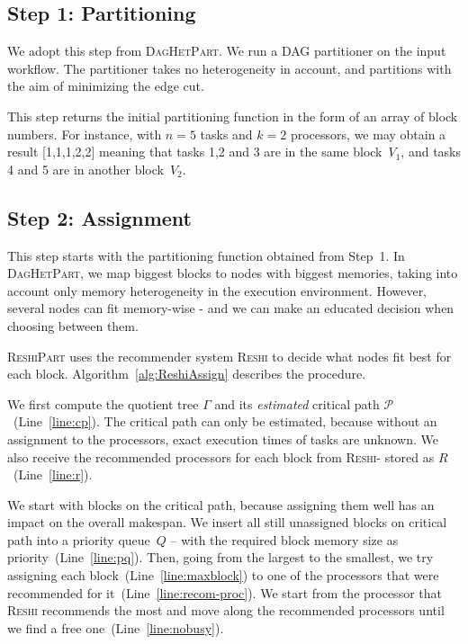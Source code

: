 \documentclass[11pt]{article}
\newcommand{\algo}[1]{\textsc{#1}}
\newcommand{\daghetpart}{\algo{DagHetPart}\xspace}
\newcommand{\reshipart}{\algo{ReshiPart}\xspace}
\newcommand{\reshi}{\algo{Reshi}\xspace}
\newcommand{\criticalpath}{\mathcal{P}}
\begin{document}
    \subsection*{Step 1: Partitioning}

    We adopt this step from \daghetpart.
    We run a DAG partitioner on the input workflow.
    The partitioner takes no heterogeneity in account, and partitions with the aim of minimizing the edge cut.

    This step returns the initial partitioning function in the form of an array of block numbers.
    For instance, with $n=5$ tasks and $k=2$ processors, we may obtain a result [1,1,1,2,2]
    meaning that tasks 1,2 and 3 are in the same block~$V_1$, and tasks 4 and 5 are
    in another block~$V_2$.

    \subsection*{Step 2: Assignment}

    This step starts with the partitioning function obtained from Step~1.
    In \daghetpart, we map biggest blocks to nodes with biggest memories, taking into account only memory heterogeneity in the
    execution environment.
    However, several nodes can fit memory-wise - and we can make an educated decision when choosing between them.

    \reshipart uses the recommender system \reshi to decide what nodes fit best for each block.
    Algorithm~\ref{alg:ReshiAssign} describes the procedure.

    We first compute the quotient tree $\Gamma$ and its \textit{estimated} critical path $\criticalpath$~(Line~\ref{line:cp}).
    The critical path can only be estimated, because without an assignment to the processors, exact execution times of tasks are unknown.
    We also receive the recommended processors for each block from \reshi - stored as $R$~(Line~\ref{line:r}).

    We start with blocks on the critical path, because assigning them well has an impact on the overall makespan.
    We insert all still unassigned blocks on critical path into a priority queue~$Q$ -- with the required block memory
    size as priority~(Line~\ref{line:pq}).
    Then, going from the largest to the smallest, we try assigning each block~(Line~\ref{line:maxblock}) to one of the
    processors that were recommended for it~(Line~\ref{line:recom-proc}).
    We start from the processor that \reshi recommends the most and move along the recommended processors until we find a free one~(Line~\ref{line:nobusy}).
\end{document}
